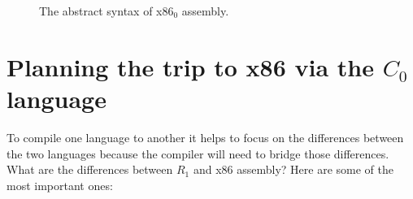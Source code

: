 \documentclass[11pt]{book}
\begin{document}
\begin{figure}[tp]
\caption{The abstract syntax of x86$_0$ assembly.}
\label{fig:x86-0-ast}
\end{figure}

\section{Planning the trip to x86 via the $C_0$ language}
\label{sec:plan-s0-x86}

To compile one language to another it helps to focus on the
differences between the two languages because the compiler will need
to bridge those differences. What are the differences between $R_1$
and x86 assembly? Here are some of the most important ones:
\end{document}
